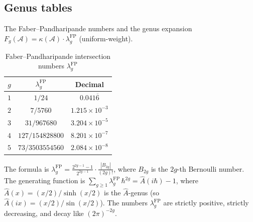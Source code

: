 \documentclass[11pt]{article}
\theoremstyle{plain}
\theoremstyle{definition}
\theoremstyle{remark}
\providecommand{\cA}{\mathcal{A}}
\begin{document}
\subsection{Genus tables}\label{ssec:genus-tables}

The Faber--Pandharipande numbers and the genus expansion
$F_g(\cA) = \kappa(\cA) \cdot \lambda_g^{\mathrm{FP}}$ (uniform-weight).

\begin{table}[ht]
\centering
\caption{Faber--Pandharipande intersection numbers $\lambda_g^{\mathrm{FP}}$}
\label{tab:faber-pandharipande}
\renewcommand{\arraystretch}{1.35}
{\small
\begin{tabular}{ccc}
\toprule
$g$ & $\lambda_g^{\mathrm{FP}}$ & Decimal \\
\midrule
$1$ & $1/24$ & $0.041\overline{6}$ \\
$2$ & $7/5760$ & $1.215 \times 10^{-3}$ \\
$3$ & $31/967680$ & $3.204 \times 10^{-5}$ \\
$4$ & $127/154828800$ & $8.201 \times 10^{-7}$ \\
$5$ & $73/3503554560$ & $2.084 \times 10^{-8}$ \\
\bottomrule
\end{tabular}
}
\end{table}

\noindent
The formula is
$\lambda_g^{\mathrm{FP}} = \frac{2^{2g-1} - 1}{2^{2g-1}}
\cdot \frac{|B_{2g}|}{(2g)!}$,
where $B_{2g}$ is the $2g$-th Bernoulli number. The generating
function is $\sum_{g \geq 1} \lambda_g^{\mathrm{FP}}\, \hbar^{2g}
= \hat{A}(i\hbar) - 1$, where $\hat{A}(x) = (x/2)/\sinh(x/2)$ is
the $\hat{A}$-genus (so $\hat{A}(ix) = (x/2)/\sin(x/2)$). The numbers $\lambda_g^{\mathrm{FP}}$ are
strictly positive, strictly decreasing, and decay like
$(2\pi)^{-2g}$.
\end{document}
